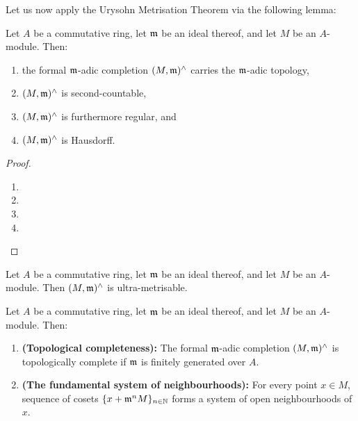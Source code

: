                 Let us now apply the Urysohn Metrisation Theorem via the following lemma:
                \begin{lemma}
                    Let $A$ be a commutative ring, let $\mathfrak{m}$ be an ideal thereof, and let $M$ be an $A$-module. Then:
                        \begin{enumerate}
                            \item the formal $\mathfrak{m}$-adic completion $(M, \mathfrak{m})^{\wedge}$ carries the $\mathfrak{m}$-adic topology,
                            \item $(M, \mathfrak{m})^{\wedge}$ is second-countable, 
                            \item $(M, \mathfrak{m})^{\wedge}$ is furthermore regular, and
                            \item $(M, \mathfrak{m})^{\wedge}$ is Hausdorff.
                        \end{enumerate}
                \end{lemma}
                    \begin{proof}
                        \noindent
                        \begin{enumerate}
                            \item 
                            \item 
                            \item 
                            \item 
                        \end{enumerate}
                    \end{proof}
                \begin{corollary}
                    Let $A$ be a commutative ring, let $\mathfrak{m}$ be an ideal thereof, and let $M$ be an $A$-module. Then $(M, \mathfrak{m})^{\wedge}$ is ultra-metrisable.
                \end{corollary}
                \begin{proposition} \label{prop: topologically_complete_adic_modules}
                    Let $A$ be a commutative ring, let $\mathfrak{m}$ be an ideal thereof, and let $M$ be an $A$-module. Then:
                        \begin{enumerate}
                            \item \textbf{(Topological completeness):} The formal $\mathfrak{m}$-adic completion $(M, \mathfrak{m})^{\wedge}$ is topologically complete if $\mathfrak{m}$ is finitely generated over $A$.
                            \item \textbf{(The fundamental system of neighbourhoods):} For every point $x \in M$, sequence of cosets $\{x + \mathfrak{m}^nM\}_{n \in \mathbb{N}}$ forms a system of open neighbourhoods of $x$.
                        \end{enumerate}
                \end{proposition}
